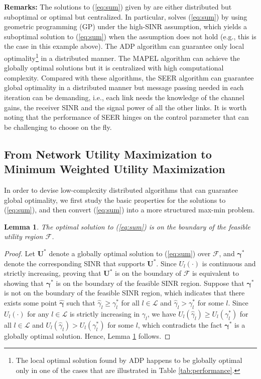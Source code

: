 \documentclass[10pt,journal,letterpaper,compsoc]{IEEEtran}
\newtheorem{lm}{Lemma}[section]
\begin{document}
\textbf{Remarks:} The solutions to (\ref{eq:sum}) given by \cite{chiang:2008,huang:2006,qian:2009} are either distributed but suboptimal or optimal but centralized. In particular, \cite{chiang:2008} solves (\ref{eq:sum}) by using geometric programming (GP) under the high-SINR assumption, which yields a suboptimal solution to (\ref{eq:sum}) when the assumption does not hold (e.g., this is the case in this example above). The ADP algorithm \cite{huang:2006} can guarantee only local optimality\footnote{The local optimal solution found by ADP happens to be globally optimal only in one of the cases that are illustrated in Table \ref{tab:performance}.} in a distributed manner. The MAPEL algorithm \cite{qian:2009} can achieve the globally optimal solutions but it is centralized with high computational complexity. Compared with these algorithms, the SEER algorithm \cite{qian:2010} can  guarantee global optimality in a distributed manner but message passing needed in each iteration can be demanding, i.e., each link needs the knowledge of the channel gains, the receiver SINR and the signal power of all the other links. It is worth noting that the performance of SEER hinges on the control parameter that can be challenging to choose on the fly.

\subsection{From Network Utility Maximization to Minimum Weighted Utility Maximization}

In order to devise low-complexity distributed algorithms that can guarantee global optimality, we first study the basic properties for the solutions to (\ref{eq:sum}), and then convert (\ref{eq:sum}) into a more structured max-min problem.

\begin{lm}
The optimal solution to (\ref{eq:sum}) is on the boundary of the feasible utility region $\mathcal{F}$.
\label{lm:boundary}
\end{lm}
\begin{proof}
Let $\mathbf{U}^*$ denote a globally optimal solution to (\ref{eq:sum}) over $\mathcal{F}$, and $\mathbf{\gamma}^*$ denote the corresponding SINR that supports $\mathbf{U}^*$. Since $U_l(\cdot)$ is continuous and strictly increasing,  proving that $\mathbf{U}^*$ is on the boundary of $\mathcal{F}$ is equivalent to showing that $\mathbf{\gamma}^*$ is on the boundary of the feasible SINR region. Suppose that $\mathbf{\gamma}^*$ is not on the boundary of the feasible SINR region, which indicates that there exists some point $\mathbf{\hat \gamma}$ such that $\hat \gamma_l \ge \gamma_l^*$ for all $l\in\mathcal{L}$ and $\hat \gamma_l > \gamma_l^*$ for some $l$. Since $U_l(\cdot)$ for any $l\in{\mathcal{L}}$ is strictly increasing in $\gamma_l$, we have $U_l(\hat \gamma_l) \ge U_l(\gamma_l^*)$ for all $l\in\mathcal{L}$ and $U_l(\hat \gamma_l) > U_l(\gamma_l^*)$ for some $l$, which contradicts the fact $\mathbf{\gamma}^*$ is a globally optimal solution. Hence, Lemma \ref{lm:boundary} follows.
\end{proof}
\end{document}
